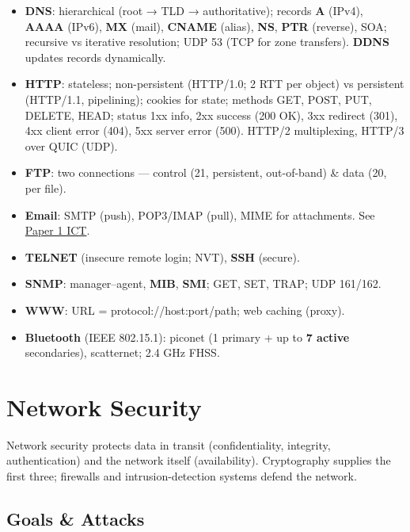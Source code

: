 \begin{itemize}
\tightlist
\item
  \textbf{DNS}: hierarchical (root → TLD → authoritative); records \textbf{A} (IPv4), \textbf{AAAA} (IPv6), \textbf{MX} (mail), \textbf{CNAME} (alias), \textbf{NS}, \textbf{PTR} (reverse), SOA; recursive vs iterative resolution; UDP 53 (TCP for zone transfers). \textbf{DDNS} updates records dynamically.
\item
  \textbf{HTTP}: stateless; non-persistent (HTTP/1.0; 2 RTT per object) vs persistent (HTTP/1.1, pipelining); cookies for state; methods GET, POST, PUT, DELETE, HEAD; status 1xx info, 2xx success (200 OK), 3xx redirect (301), 4xx client error (404), 5xx server error (500). HTTP/2 multiplexing, HTTP/3 over QUIC (UDP).
\item
  \textbf{FTP}: two connections --- control (21, persistent, out-of-band) \& data (20, per file).
\item
  \textbf{Email}: SMTP (push), POP3/IMAP (pull), MIME for attachments. See \protect\hyperlink{p1-08}{Paper 1 ICT}.
\item
  \textbf{TELNET} (insecure remote login; NVT), \textbf{SSH} (secure).
\item
  \textbf{SNMP}: manager--agent, \textbf{MIB}, \textbf{SMI}; GET, SET, TRAP; UDP 161/162.
\item
  \textbf{WWW}: URL = protocol://host:port/path; web caching (proxy).
\item
  \textbf{Bluetooth} (IEEE 802.15.1): piconet (1 primary + up to \textbf{7 active} secondaries), scatternet; 2.4 GHz FHSS.
\end{itemize}

\needspace{227pt}

\hypertarget{p2-09--11-network-security}{%
\section{Network Security}\label{p2-09--11-network-security}}

Network security protects data in transit (confidentiality, integrity, authentication) and the network itself
(availability). Cryptography supplies the first three; firewalls and intrusion-detection systems defend the
network.

\needspace{161pt}

\hypertarget{p2-09--111-goals--attacks}{%
\subsection{Goals \& Attacks}\label{p2-09--111-goals--attacks}}

